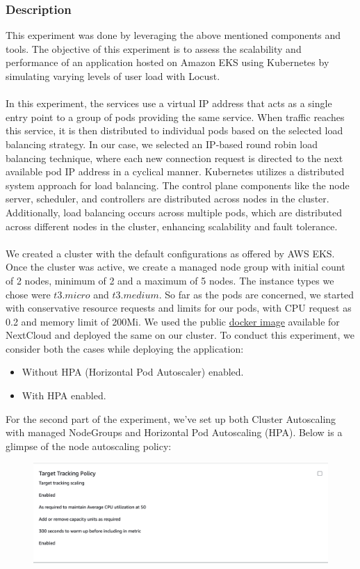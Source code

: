 \documentclass{article}
\begin{document}
\subsubsection{Description}
This experiment was done by leveraging the above mentioned components and tools. The objective of this experiment is to assess the scalability and performance of an application hosted on Amazon EKS using Kubernetes by simulating varying levels of user load with Locust.
\\\\
In this experiment, the services use a virtual IP address that acts as a single entry point to a group of pods providing the same service. When traffic reaches this service, it is then distributed to individual pods based on the selected load balancing strategy. In our case, we selected an IP-based round robin load balancing technique, where each new connection request is directed to the next available pod IP address in a cyclical manner. Kubernetes utilizes a distributed system approach for load balancing. The control plane components like the node server, scheduler, and controllers are distributed across nodes in the cluster. Additionally, load balancing occurs across multiple pods, which are distributed across different nodes in the cluster, enhancing scalability and fault tolerance.
\\\\
We created a cluster with the default configurations as offered by AWS EKS. Once the cluster was active, we create a managed node group with initial count of 2 nodes, minimum of 2 and a maximum of 5 nodes. The instance types we chose were $t3.micro$ and $t3.medium$. So far as the pods are concerned, we started with conservative resource requests and limits for our pods, with CPU request as 0.2 and memory limit of 200Mi. We used the public \href{https://hub.docker.com/_/nextcloud}{docker image} available for NextCloud and deployed the same on our cluster. 
\newpage
To conduct this experiment, we consider both the cases while deploying the application: 
\begin{itemize}
    \item Without HPA (Horizontal Pod Autoscaler) enabled.
    \item With HPA enabled.
\end{itemize}
For the second part of the experiment, we've set up both Cluster Autoscaling with managed NodeGroups and Horizontal Pod Autoscaling (HPA).
Below is a glimpse of the node autoscaling policy:
\begin{figure}[H]
    \centering
    \includegraphics[width=0.75\linewidth]{images/autoscale_nodes.png}
\end{figure}
\end{document}
